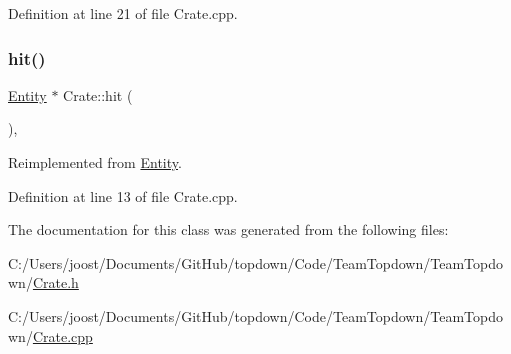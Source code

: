 Definition at line 21 of file Crate.\+cpp.

\mbox{\label{class_crate_a6e4a24b12c92e8576c107b60f0b8f1a8}} 
\subsubsection{\texorpdfstring{hit()}{hit()}}
{\footnotesize\ttfamily \hyperlink{class_entity}{Entity} $\ast$ Crate\+::hit (\begin{DoxyParamCaption}{ }\end{DoxyParamCaption})\hspace{0.3cm}{\ttfamily [override]}, {\ttfamily [virtual]}}



Reimplemented from \hyperlink{class_entity_a29117f3f40e7069d5d4c1b2fca7819d6}{Entity}.



Definition at line 13 of file Crate.\+cpp.



The documentation for this class was generated from the following files\+:\begin{DoxyCompactItemize}
\item 
C\+:/\+Users/joost/\+Documents/\+Git\+Hub/topdown/\+Code/\+Team\+Topdown/\+Team\+Topdown/\hyperlink{_crate_8h}{Crate.\+h}\item 
C\+:/\+Users/joost/\+Documents/\+Git\+Hub/topdown/\+Code/\+Team\+Topdown/\+Team\+Topdown/\hyperlink{_crate_8cpp}{Crate.\+cpp}\end{DoxyCompactItemize}
